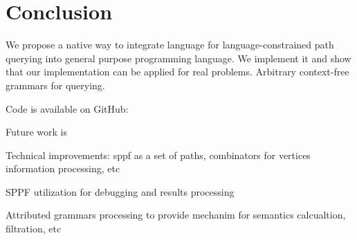 \section{Conclusion}

We propose a native way to integrate language for language-constrained path querying into general purpose programming language.
We implement it and show that our implementation can be applied for real  problems.
Arbitrary context-free grammars for querying.

Code is available on GitHub: 

Future work is

Technical improvements: sppf as a set of paths, combinators for vertices information processing, etc

SPPF utilization for debugging and results processing

Attributed grammars processing to provide mechanim for semantics calcualtion, filtration, etc